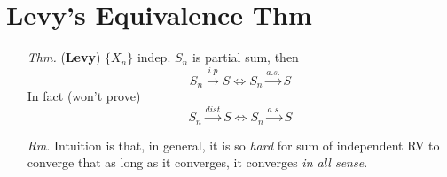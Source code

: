 \documentclass[a4paper,12pt,twoside]{book}
\begin{document}
\section{Levy's Equivalence Thm}
\begin{itemize}
	\item[\textit{Thm.}] (\textbf{Levy}) $\{X_n\}$ indep. $S_n$ is partial sum, then
	\begin{equation}
		S_n \xrightarrow{i.p} S \iff S_n \xrightarrow{a.s.} S
	\end{equation}
	In fact (won't prove)
	\begin{equation}
		S_n \xrightarrow{dist} S \iff S_n \xrightarrow{a.s.} S
	\end{equation}

	\item[\textit{Rm.}] Intuition is that, in general, it is so \textit{hard} for sum of independent RV to converge that as long as it converges, it converges \textit{in all sense}.


\end{itemize}
\end{document}
